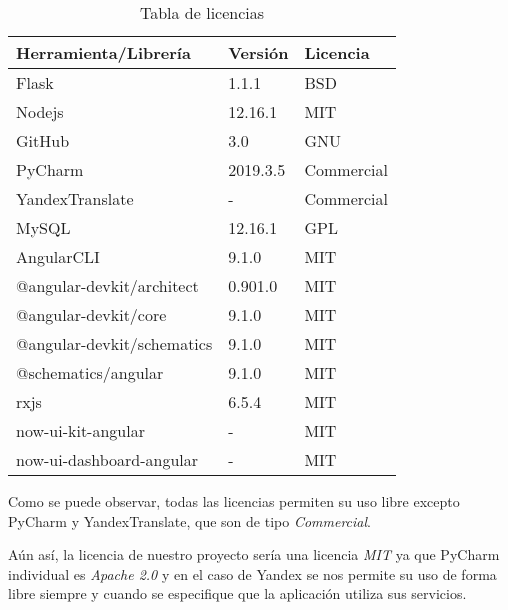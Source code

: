 \begin{table}[ht!]
    \centering
    \resizebox{15cm}{!} {
    \begin{tabular}{|l|l|l|}
    \hline
         \textbf{Herramienta/Librería}     &  \textbf{Versión}   &\textbf{Licencia} \\ \hline
         {Flask}       & {1.1.1}  &{BSD} \\ \hline
         {Nodejs}       & {12.16.1}     &{MIT} \\ \hline 
         {GitHub}       & {3.0}    &{GNU} \\ \hline 
         {PyCharm}       & {2019.3.5}     &{Commercial} \\ \hline
         {YandexTranslate}       & {-}    &{Commercial} \\ \hline 
         {MySQL}       & {12.16.1}   &{GPL} \\ \hline 
         {AngularCLI}      &{9.1.0}     &{MIT} \\\hline
         {@angular-devkit/architect}       & {0.901.0}    &{MIT} \\ \hline 
         {@angular-devkit/core}       & {9.1.0}    &{MIT} \\ \hline 
         {@angular-devkit/schematics}       & {9.1.0}    &{MIT} \\ \hline
         {@schematics/angular}       & {9.1.0}    &{MIT} \\ \hline 
         {rxjs}       & {6.5.4}    &{MIT} \\ \hline 
         {now-ui-kit-angular}       & {-}    &{MIT} \\ \hline 
         {now-ui-dashboard-angular}       & {-}    &{MIT} \\ \hline 
    \end{tabular}}
    \caption{Tabla de licencias}
    \label{tab:my_label}
\end{table}
\newpage
Como se puede observar, todas las licencias permiten su uso libre excepto PyCharm y YandexTranslate, que son de tipo \textit{Commercial}. 

Aún así, la licencia de nuestro proyecto sería una licencia \textit{MIT} ya que PyCharm individual es \textit{Apache 2.0} y en el caso de Yandex se nos permite su uso de forma libre siempre y cuando se especifique que la aplicación utiliza sus servicios.



